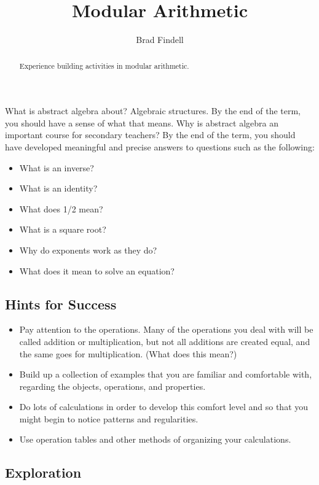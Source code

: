 \documentclass[space,nooutcomes]{ximera}
\title{Modular Arithmetic}
\author{Brad Findell}
\begin{document}
\begin{abstract}
Experience building activities in modular arithmetic.  
\end{abstract}
\maketitle

What is abstract algebra about?  Algebraic structures.  By the end of the term, you should have a sense of what that means.  Why is abstract algebra an important course for secondary teachers?  By the end of the term, you should have developed meaningful and precise answers to questions such as the following: 

\begin{itemize}
\item What is an inverse? 
\item What is an identity?
\item What does 1/2 mean?
\item What is a square root?
\item Why do exponents work as they do?
\item What does it mean to solve an equation?
\end{itemize}

\subsection{Hints for Success}
\begin{itemize}
\item Pay attention to the operations.  Many of the operations you deal with will be called addition or multiplication, but not all additions are created equal, and the same goes for multiplication.  (What does this mean?)
\item Build up a collection of examples that you are familiar and comfortable with, regarding the objects, operations, and properties.  
\item Do lots of calculations in order to develop this comfort level and so that you might begin to notice patterns and regularities. 
\item Use operation tables and other methods of organizing your calculations.
\end{itemize}


\subsection{Exploration}
\end{document}
